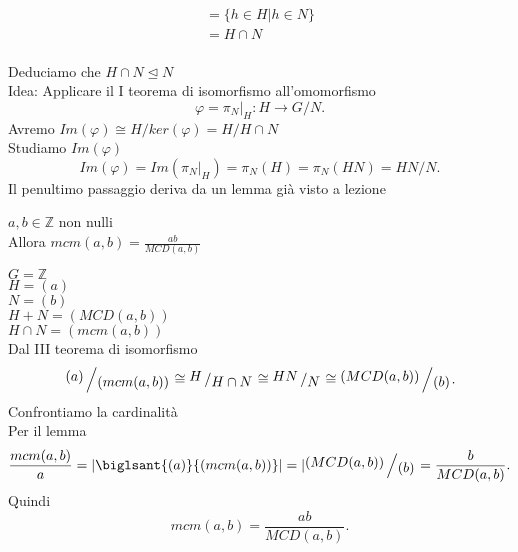 \documentclass[12px]{article}
\begin{document}
{\begin{dimo}
\begin{gather*}
					       =\{h\in H| h\in N\}\\
					       =H\cap N
			\end{gather*}\\
			Deduciamo che $H\cap N\trianglelefteq N$\\
			Idea: Applicare il I teorema di isomorfismo all'omomorfismo
			 \[
			\varphi=\pi_N|_H:H \rightarrow G/N
			.\] 
			Avremo $Im( \varphi)\cong H/ker( \varphi) = H/H\cap N$\\
			Studiamo $Im( \varphi)$\\
	\[
	Im( \varphi) = Im( \pi_N|_H) = \pi_N(H) = \pi_N(HN) = HN/N
	.\] 
	Il penultimo passaggio deriva da un lemma già visto a lezione
		\end{dimo}
		\newpage
		\begin{coro}
			$a,b\in \mathbb Z$ non nulli\\
			Allora $mcm(a,b) = \frac {ab} {MCD(a,b)}$
		\end{coro}
		\begin{dimo}
			$G = \mathbb Z$ \\
			$H = (a)$\\
			 $N= (b)$\\
			  $H+N = (MCD(a,b))$\\
			   $H\cap N = (mcm(a,b))$\\
		Dal III teorema di isomorfismo 
		 \[
			 \bigslant{(a)}{(mcm(a,b))}\cong \bigslant H {H\cap N}\cong \bigslant {HN} N \cong \bigslant{(MCD(a,b))}{(b)}
		.\] 
		Confrontiamo la cardinalità\\
		Per il lemma\\
		\[
			\frac {mcm(a,b)}{a} = |\biglsant {(a)}{(mcm(a,b))}| = |\bigslant {(MCD(a,b))}{(b)} = \frac {b}{MCD(a,b)}
		.\] 
		Quindi 
		\[
			mcm(a,b) = \frac {ab}{MCD(a,b)}
		.\] 
		\end{dimo}
}
\end{document}
